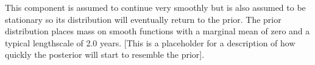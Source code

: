 This component is assumed to continue very smoothly but is also assumed to be stationary so its distribution will eventually return to the prior.
The prior distribution places mass on smooth functions with a marginal mean of zero and a typical lengthscale of 2.0 years.
[This is a placeholder for a description of how quickly the posterior will start to resemble the prior].